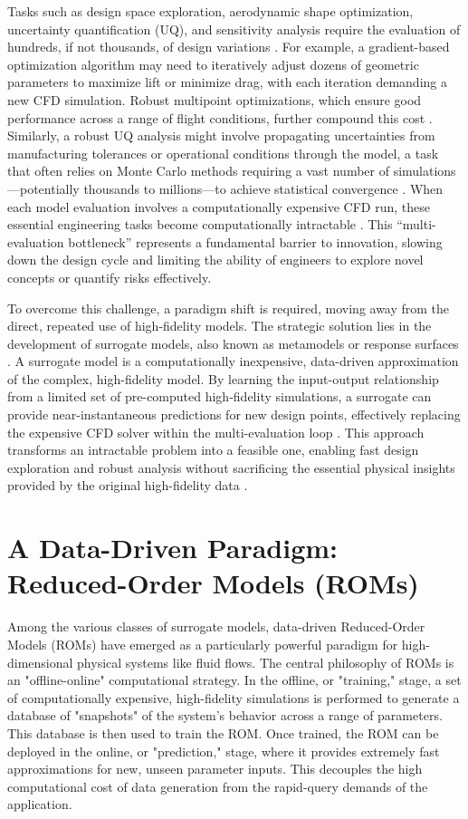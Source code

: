 Tasks such as design space exploration, aerodynamic shape optimization, uncertainty quantification (UQ), and sensitivity analysis require the evaluation of hundreds, if not thousands, of design variations \citep{Yondo2018}. For example, a gradient-based optimization algorithm may need to iteratively adjust dozens of geometric parameters to maximize lift or minimize drag, with each iteration demanding a new CFD simulation. Robust multipoint optimizations, which ensure good performance across a range of flight conditions, further compound this cost \citep{Kenway2016}. Similarly, a robust UQ analysis might involve propagating uncertainties from manufacturing tolerances or operational conditions through the model, a task that often relies on Monte Carlo methods requiring a vast number of simulations---potentially thousands to millions---to achieve statistical convergence \citep{Smith2014}. When each model evaluation involves a computationally expensive CFD run, these essential engineering tasks become computationally intractable \citep{Slotnick2014}. This ``multi-evaluation bottleneck'' represents a fundamental barrier to innovation, slowing down the design cycle and limiting the ability of engineers to explore novel concepts or quantify risks effectively.

To overcome this challenge, a paradigm shift is required, moving away from the direct, repeated use of high-fidelity models. The strategic solution lies in the development of surrogate models, also known as metamodels or response surfaces \citep{Hu2020}. A surrogate model is a computationally inexpensive, data-driven approximation of the complex, high-fidelity model. By learning the input-output relationship from a limited set of pre-computed high-fidelity simulations, a surrogate can provide near-instantaneous predictions for new design points, effectively replacing the expensive CFD solver within the multi-evaluation loop \citep{Yondo2018, EspinosaBarcenas2023}. This approach transforms an intractable problem into a feasible one, enabling fast design exploration and robust analysis without sacrificing the essential physical insights provided by the original high-fidelity data \citep{Hu2020}.



\section{A Data-Driven Paradigm: Reduced-Order Models (ROMs)}

Among the various classes of surrogate models, data-driven Reduced-Order Models (ROMs) have emerged as a particularly powerful paradigm for high-dimensional physical systems like fluid flows. The central philosophy of ROMs is an "offline-online" computational strategy. In the offline, or "training," stage, a set of computationally expensive, high-fidelity simulations is performed to generate a database of "snapshots" of the system's behavior across a range of parameters. This database is then used to train the ROM. Once trained, the ROM can be deployed in the online, or "prediction," stage, where it provides extremely fast approximations for new, unseen parameter inputs. This decouples the high computational cost of data generation from the rapid-query demands of the application.

